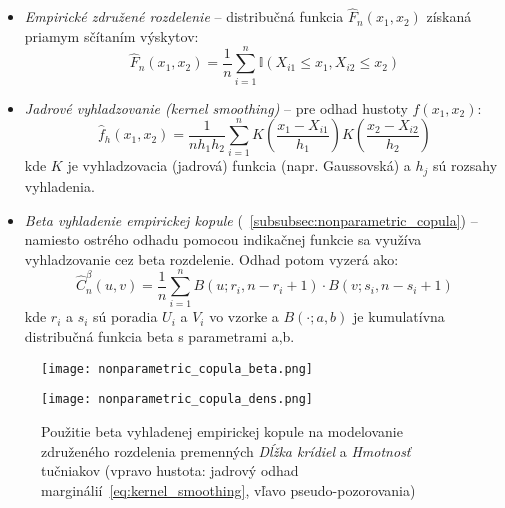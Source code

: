 \begin{itemize}
  \item \textit{Empirické združené rozdelenie} – distribučná funkcia $\hat{F}_n(x_1, x_2)$ získaná priamym sčítaním výskytov:
  \begin{equation}
  \hat{F}_n(x_1, x_2) = \frac{1}{n} \sum_{i=1}^{n} \mathbb{I}(X_{i1} \leq x_1, X_{i2} \leq x_2)
  \end{equation}
  \item \textit{Jadrové vyhladzovanie (kernel smoothing)} – pre odhad hustoty $f(x_1, x_2)$:
  \begin{equation}
  \hat{f}_h(x_1, x_2) = \frac{1}{n h_1 h_2} \sum_{i=1}^{n} K\left( \frac{x_1 - X_{i1}}{h_1} \right) K\left( \frac{x_2 - X_{i2}}{h_2} \right)
  \end{equation}
  kde $K$ je vyhladzovacia (jadrová) funkcia (napr. Gaussovská) a $h_j$ sú rozsahy vyhladenia.

  \item \textit{Beta vyhladenie empirickej kopule} (~\ref{subsubsec:nonparametric_copula}) – namiesto ostrého odhadu pomocou indikačnej funkcie sa využíva vyhladzovanie cez beta rozdelenie. Odhad potom vyzerá ako:
  \begin{equation}
    \hat{C}_n^{\beta}(u, v) = \frac{1}{n} \sum_{i=1}^n B(u; r_i, n - r_i + 1) \cdot B(v; s_i, n - s_i + 1)
  \end{equation}
  kde $r_i$ a $s_i$ sú poradia $U_i$ a $V_i$ vo vzorke a $B(\cdot; a,b)$ je kumulatívna distribučná funkcia beta s parametrami a,b.
  
\end{itemize}

\begin{figure}[H]
    \centering
    \begin{minipage}[t]{0.48\linewidth}
        \centering
        \texttt{[image: nonparametric\_copula\_beta.png]}
    \end{minipage}
    \hfill
    \begin{minipage}[t]{0.48\linewidth}
        \centering
        \texttt{[image: nonparametric\_copula\_dens.png]}
    \end{minipage}
    \caption{Použitie beta vyhladenej empirickej kopule na modelovanie združeného rozdelenia premenných \textit{Dĺžka krídiel} a \textit{Hmotnosť} tučniakov (vpravo hustota: jadrový odhad marginálií~\ref{eq:kernel_smoothing}, vľavo pseudo-pozorovania)}
    \label{fig:empcopula}
\end{figure}

